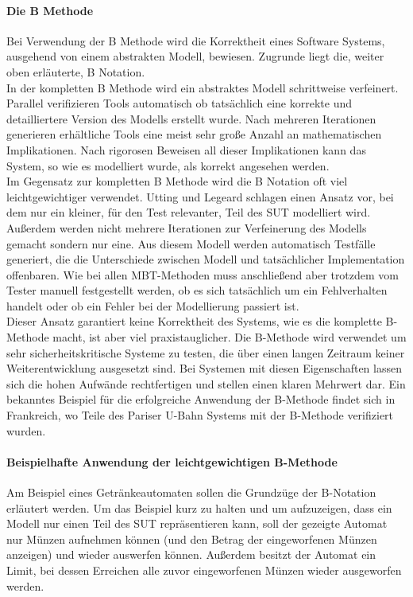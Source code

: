 \paragraph{Die B Methode}
\label{sec:bmethod}
Bei Verwendung der B Methode wird die Korrektheit eines Software Systems, ausgehend von einem abstrakten Modell, bewiesen. Zugrunde liegt die, weiter oben erläuterte, B Notation.\\
In der kompletten B Methode wird ein abstraktes Modell schrittweise verfeinert. Parallel verifizieren Tools automatisch ob tatsächlich eine korrekte und detailliertere Version des Modells erstellt wurde. Nach mehreren Iterationen generieren erhältliche Tools eine meist sehr große Anzahl an mathematischen Implikationen. Nach rigorosen Beweisen all dieser Implikationen kann das System, so wie es modelliert wurde, als korrekt angesehen werden.\\
Im Gegensatz zur kompletten B Methode wird die B Notation oft viel leichtgewichtiger verwendet. Utting und Legeard\cite{utting_practical_2007} schlagen einen Ansatz vor, bei dem nur ein kleiner, für den Test relevanter, Teil des SUT modelliert wird. Außerdem werden nicht mehrere Iterationen zur Verfeinerung des Modells gemacht sondern nur eine. Aus diesem Modell werden automatisch Testfälle generiert, die die Unterschiede zwischen Modell und tatsächlicher Implementation offenbaren. Wie bei allen MBT-Methoden muss anschließend aber trotzdem vom Tester manuell festgestellt werden, ob es sich tatsächlich um ein Fehlverhalten handelt oder ob ein Fehler bei der Modellierung passiert ist.\\
Dieser Ansatz garantiert keine Korrektheit des Systems, wie es die komplette B-Methode macht, ist aber viel praxistauglicher. Die B-Methode wird verwendet um sehr sicherheitskritische Systeme zu testen, die über einen langen Zeitraum keiner Weiterentwicklung ausgesetzt sind. Bei Systemen mit diesen Eigenschaften lassen sich die hohen Aufwände rechtfertigen und stellen einen klaren Mehrwert dar. Ein bekanntes Beispiel für die erfolgreiche Anwendung der B-Methode findet sich in Frankreich, wo Teile des Pariser U-Bahn Systems mit der B-Methode verifiziert wurden. \cite{lecomte_formal_2007}

\paragraph{Beispielhafte Anwendung der leichtgewichtigen B-Methode}
Am Beispiel eines Getränkeautomaten sollen die Grundzüge der B-Notation erläutert werden. Um das Beispiel kurz zu halten und um aufzuzeigen, dass ein Modell nur einen Teil des SUT repräsentieren kann, soll der gezeigte Automat nur Münzen aufnehmen können (und den Betrag der eingeworfenen Münzen anzeigen) und wieder auswerfen können. Außerdem besitzt der Automat ein Limit, bei dessen Erreichen alle zuvor eingeworfenen Münzen wieder ausgeworfen werden.

